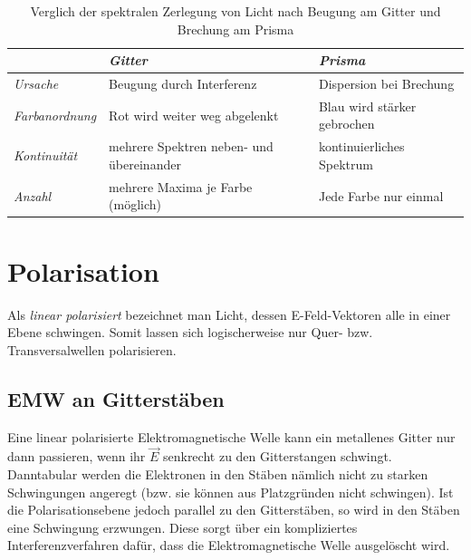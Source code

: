 \begin{table}[h]
	\centering
	
   \begin{tabular}{l | l | l}
      ~ & \textbf{\textit{Gitter}} & \textbf{\textit{Prisma}} \\
      \hline
      \textit{Ursache} & Beugung durch Interferenz & Dispersion bei Brechung \\
      \textit{Farbanordnung} & Rot wird weiter weg abgelenkt & Blau wird stärker gebrochen\\
      \textit{Kontinuität} & mehrere Spektren neben- und übereinander & kontinuierliches Spektrum \\
      \textit{Anzahl} & mehrere Maxima je Farbe (möglich) & Jede Farbe nur einmal \\      
   \end{tabular}
\caption{Verglich der spektralen Zerlegung von Licht nach Beugung am Gitter und Brechung am Prisma}
\label{tab_spektrenvergleich}
\end{table}






		\chapter{Polarisation}

Als \textit{linear polarisiert} bezeichnet man Licht, dessen E-Feld-Vektoren alle in einer Ebene schwingen. Somit lassen sich logischerweise nur Quer- bzw. Transversalwellen polarisieren.


	\section{EMW an Gitterstäben}

Eine linear polarisierte Elektromagnetische Welle kann ein metallenes Gitter nur dann passieren, wenn ihr \(\vec{E}\) senkrecht zu den Gitterstangen schwingt. Danntabular werden die Elektronen in den Stäben nämlich nicht zu starken Schwingungen angeregt (bzw. sie können aus Platzgründen nicht schwingen). Ist die Polarisationsebene jedoch parallel zu den Gitterstäben, so wird in den Stäben eine Schwingung erzwungen. Diese sorgt über ein kompliziertes Interferenzverfahren dafür, dass die Elektromagnetische Welle ausgelöscht wird.

